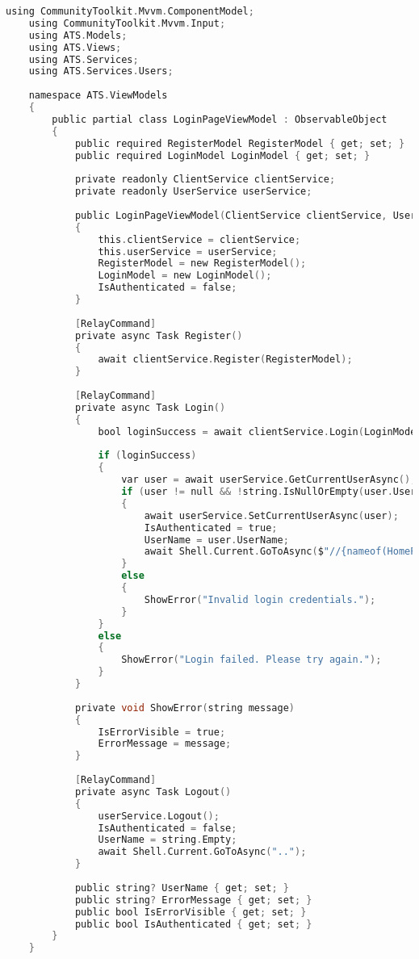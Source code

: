 \begin{lstlisting}[language=C, caption=ViewModel voor loginpagina, label=lst:login-viewmodel]
    using CommunityToolkit.Mvvm.ComponentModel;
    using CommunityToolkit.Mvvm.Input;
    using ATS.Models;
    using ATS.Views;
    using ATS.Services;
    using ATS.Services.Users;
    
    namespace ATS.ViewModels
    {
        public partial class LoginPageViewModel : ObservableObject
        {
            public required RegisterModel RegisterModel { get; set; }
            public required LoginModel LoginModel { get; set; }
            
            private readonly ClientService clientService;
            private readonly UserService userService;
            
            public LoginPageViewModel(ClientService clientService, UserService userService)
            {
                this.clientService = clientService;
                this.userService = userService;
                RegisterModel = new RegisterModel();
                LoginModel = new LoginModel();
                IsAuthenticated = false;
            }
            
            [RelayCommand]
            private async Task Register()
            {
                await clientService.Register(RegisterModel);
            }
            
            [RelayCommand]
            private async Task Login()
            {
                bool loginSuccess = await clientService.Login(LoginModel);
                
                if (loginSuccess)
                {
                    var user = await userService.GetCurrentUserAsync();
                    if (user != null && !string.IsNullOrEmpty(user.UserName))
                    {
                        await userService.SetCurrentUserAsync(user);
                        IsAuthenticated = true;
                        UserName = user.UserName;
                        await Shell.Current.GoToAsync($"//{nameof(HomePage)}");
                    }
                    else
                    {
                        ShowError("Invalid login credentials.");
                    }
                }
                else
                {
                    ShowError("Login failed. Please try again.");
                }
            }
            
            private void ShowError(string message)
            {
                IsErrorVisible = true;
                ErrorMessage = message;
            }
            
            [RelayCommand]
            private async Task Logout()
            {
                userService.Logout();
                IsAuthenticated = false;
                UserName = string.Empty;
                await Shell.Current.GoToAsync("..");
            }
            
            public string? UserName { get; set; }
            public string? ErrorMessage { get; set; }
            public bool IsErrorVisible { get; set; }
            public bool IsAuthenticated { get; set; }
        }
    }
\end{lstlisting}

